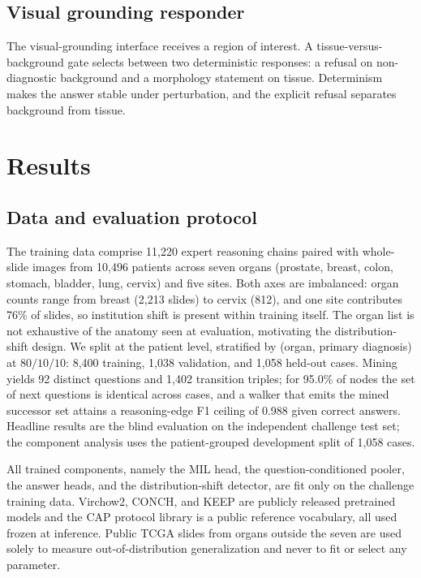 \documentclass[runningheads]{llncs}
\begin{document}
\subsection{Visual grounding responder}
The visual-grounding interface receives a region of interest. A tissue-versus-background gate selects between two
deterministic responses: a refusal on non-diagnostic background and a morphology statement on tissue. Determinism
makes the answer stable under perturbation, and the explicit refusal separates background from tissue.

\section{Results}
\label{sec:exp}

\subsection{Data and evaluation protocol}
The training data comprise 11{,}220 expert reasoning chains paired with whole-slide images from 10{,}496
patients across seven organs (prostate, breast, colon, stomach, bladder, lung, cervix) and five sites. Both
axes are imbalanced: organ counts range from breast (2{,}213 slides) to cervix (812), and one site contributes
76\% of slides, so institution shift is present within training itself. The organ list is not exhaustive of the
anatomy seen at evaluation, motivating the distribution-shift design. We split at the patient level, stratified
by (organ, primary diagnosis) at $80/10/10$: 8{,}400 training, 1{,}038 validation, and 1{,}058 held-out cases.
Mining yields 92 distinct questions and 1{,}402 transition triples; for 95.0\% of nodes the set of next
questions is identical across cases, and a walker that emits the mined successor set attains a reasoning-edge
F1 ceiling of 0.988 given correct answers. Headline results are the blind evaluation on the independent
challenge test set; the component analysis uses the patient-grouped development split of 1{,}058 cases.

All trained components, namely the MIL head, the question-conditioned pooler, the answer heads, and the
distribution-shift detector, are fit only on the challenge training data. Virchow2, CONCH, and KEEP are publicly
released pretrained models and the CAP protocol library is a public reference vocabulary, all used frozen at
inference. Public TCGA slides from organs outside the seven are used solely to measure out-of-distribution
generalization and never to fit or select any parameter.
\end{document}
